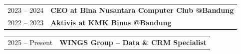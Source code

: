 \begin{singlespace}

\noindent
\begin{tabular}{p{4.5cm} p{9.5cm}}

2023 -- 2024 & \textbf{CEO at Bina Nusantara Computer Club @Bandung} \\
2022 -- 2023 & \textbf{Aktivis at KMK Binus @Bandung} \\
\end{tabular}


\noindent
\begin{tabular}{p{4.5cm} p{9.5cm}}
2025 -- Present & \textbf{WINGS Group -- Data \& CRM Specialist} \\
\end{tabular}
\end{singlespace}